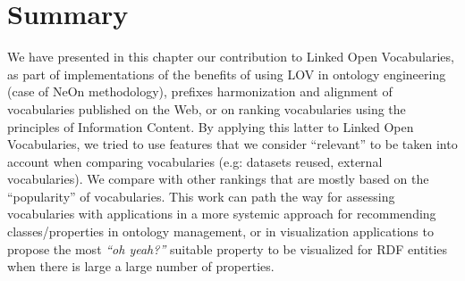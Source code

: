 \begin{figure}
 
 \end{figure}


\section{Summary}
\label{ch6:conclusion}
We have presented in this chapter our contribution to Linked Open Vocabularies, as part of implementations of the benefits of using LOV in ontology engineering (case of NeOn methodology), prefixes harmonization and alignment of vocabularies published on the Web, or on ranking vocabularies using the principles of Information Content. By applying this latter to Linked Open Vocabularies, we tried to use features that we consider ``relevant'' to be taken into account when comparing vocabularies (e.g: datasets reused, external vocabularies). We compare with other rankings that are mostly based on the ``popularity'' of vocabularies. This work can path the way for assessing vocabularies with applications in a more systemic approach for recommending classes/properties in ontology management, or in visualization applications to propose the most \textit{``oh yeah?''} suitable property to be visualized for RDF entities when there is large a large number of properties.






